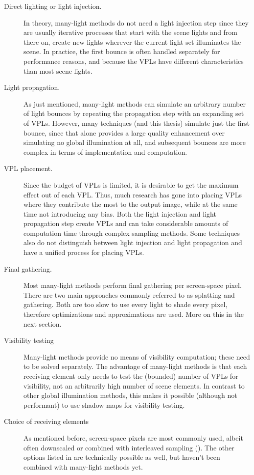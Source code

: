 \begin{description}
    \item[Direct lighting or light injection.] In theory, many-light methods do not need a light injection step since they are usually iterative processes that start with the scene lights and from there on, create new lights wherever the current light set illuminates the scene. In practice, the first bounce is often handled separately for performance reasons, and because the VPLs have different characteristics than most scene lights.
    \item[Light propagation.] As just mentioned, many-light methods can simulate an arbitrary number of light bounces by repeating the propagation step with an expanding set of VPLs. However, many techniques (and this thesis) simulate just the first bounce, since that alone provides a large quality enhancement over simulating no global illumination at all, and subsequent bounces are more complex in terms of implementation and computation.
    \item[VPL placement.] Since the budget of VPLs is limited, it is desirable to get the maximum effect out of each VPL. Thus, much research has gone into placing VPLs where they contribute the most to the output image, while at the same time not introducing any bias. Both the light injection and light propagation step create VPLs and can take considerable amounts of computation time through complex sampling methods. Some techniques also do not distinguish between light injection and light propagation and have a unified process for placing VPLs.
    \item[Final gathering.] Most many-light methods perform final gathering per screen-space pixel. There are two main approaches commonly referred to as splatting and gathering. Both are too slow to use every light to shade every pixel, therefore optimizations and approximations are used. More on this in the next section.
    \item[Visibility testing] Many-light methods provide no means of visibility computation; these need to be solved separately. The advantage of many-light methods is that each receiving element only needs to test the (bounded) number of VPLs for visibility, not an arbitrarily high number of scene elements. In contrast to other global illumination methods, this makes it possible (although not performant) to use shadow maps for visibility testing.
    \item[Choice of receiving elements] As mentioned before, screen-space pixels are most commonly used, albeit often downscaled or combined with interleaved sampling (). The other options listed in  are technically possible as well, but haven't been combined with many-light methods yet.

\end{description}
